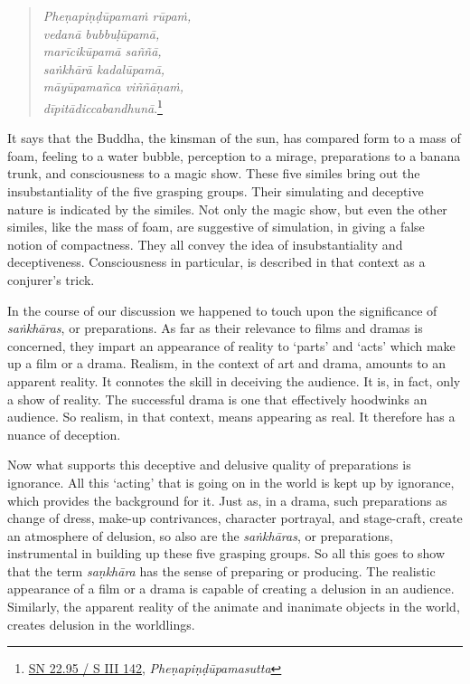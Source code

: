 \begin{quote}
\emph{Pheṇapiṇḍūpamaṁ rūpaṁ,}\\
\emph{vedanā bubbuḷūpamā,}\\
\emph{marīcikūpamā saññā,}\\
\emph{saṅkhārā kadalūpamā,}\\
\emph{māyūpamañca viññāṇaṁ,}\\
\emph{dīpitādiccabandhunā}.\footnote{\href{https://suttacentral.net/sn22.95/pli/ms}{SN 22.95 / S III 142}, \emph{Pheṇapiṇḍūpamasutta}}
\end{quote}

It says that the Buddha, the kinsman of the sun, has compared form to a mass of foam, feeling to a water bubble, perception to a mirage, preparations to a banana trunk, and consciousness to a magic show. These five similes bring out the insubstantiality of the five grasping groups. Their simulating and deceptive nature is indicated by the similes. Not only the magic show, but even the other similes, like the mass of foam, are suggestive of simulation, in giving a false notion of compactness. They all convey the idea of insubstantiality and deceptiveness. Consciousness in particular, is described in that context as a conjurer's trick.

\clearpage

In the course of our discussion we happened to touch upon the significance of \emph{saṅkhāras}, or preparations. As far as their relevance to films and dramas is concerned, they impart an appearance of reality to `parts' and `acts' which make up a film or a drama. Realism, in the context of art and drama, amounts to an apparent reality. It connotes the skill in deceiving the audience. It is, in fact, only a show of reality. The successful drama is one that effectively hoodwinks an audience. So realism, in that context, means appearing as real. It therefore has a nuance of deception.

Now what supports this deceptive and delusive quality of preparations is ignorance. All this `acting' that is going on in the world is kept up by ignorance, which provides the background for it. Just as, in a drama, such preparations as change of dress, make-up contrivances, character portrayal, and stage-craft, create an atmosphere of delusion, so also are the \emph{saṅkhāras}, or preparations, instrumental in building up these five grasping groups. So all this goes to show that the term \emph{saṇkhāra} has the sense of preparing or producing. The realistic appearance of a film or a drama is capable of creating a delusion in an audience. Similarly, the apparent reality of the animate and inanimate objects in the world, creates delusion in the worldlings.

